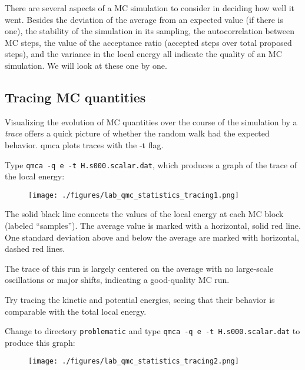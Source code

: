There are several aspects of a MC simulation to consider in deciding how well
it went.  Besides the deviation of the average from an expected value (if there
is one), the stability of the simulation in its sampling, the autocorrelation
between MC steps, the value of the acceptance ratio (accepted steps over total
proposed steps), and the variance in the local energy all indicate the quality
of an MC simulation.  We will look at these one by one.

\subsection{Tracing MC quantities}

Visualizing the evolution of MC quantities over the course of the simulation by
a \textit{trace} offers a quick picture of whether the random walk had the expected
behavior.  qmca plots traces with the -t flag.

Type \texttt{qmca -q e -t H.s000.scalar.dat}, which produces a graph of the
trace of the local energy:

\FloatBarrier
\begin{figure}[ht!]
\begin{center}
\texttt{[image: ./figures/lab\_qmc\_statistics\_tracing1.png]}
\end{center}
\end{figure}
\FloatBarrier


The solid black line connects the values of the local energy at each MC block
(labeled ``samples'').  The average value is marked with a horizontal, solid
red line.  One standard deviation above and below the average are marked with
horizontal, dashed red lines.  

The trace of this run is largely centered on the average with no
large-scale oscillations or major shifts, indicating a good-quality MC run. 

Try tracing the kinetic and potential energies, seeing that their behavior is
comparable with the total local energy.

Change to directory \texttt{problematic} and type \texttt{qmca -q e -t
H.s000.scalar.dat} to produce this graph:

\FloatBarrier
\begin{figure}[ht!]
\begin{center}
\texttt{[image: ./figures/lab\_qmc\_statistics\_tracing2.png]}
\end{center}
\end{figure}
\FloatBarrier

